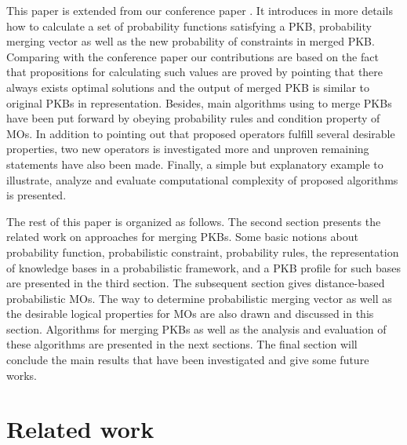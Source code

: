 \documentclass[]{iosart2c}
\begin{document}
  This paper is extended from our conference paper \cite{24}. It introduces in more details how to calculate a set of
  probability functions satisfying a PKB, probability merging vector as well as the new probability of constraints in
  merged PKB. Comparing with the conference paper our contributions are based on the fact that propositions for
  calculating such values are proved by pointing that there always exists optimal solutions \cite{25} and the output of
  merged PKB is similar to original PKBs in representation. Besides, main algorithms using to merge PKBs have been put
  forward by obeying probability rules and condition property of MOs. In addition to pointing out that proposed
  operators fulfill several desirable properties, two new operators is investigated more and unproven remaining
  statements have also been made. Finally, a simple but explanatory example to illustrate, analyze and evaluate
  computational complexity of proposed algorithms is presented.

  The rest of this paper is organized as follows. The second section presents the related work on approaches for
  merging PKBs. Some basic notions about probability function, probabilistic constraint, probability rules, the
  representation of knowledge bases in a probabilistic framework, and a PKB profile for such bases are presented in
  the third section. The subsequent section gives distance-based probabilistic MOs. The way to determine probabilistic
  merging vector as well as the desirable logical properties for MOs are also drawn and discussed in this section.
  Algorithms for merging PKBs as well as the analysis and evaluation of these algorithms are presented in the next
  sections. The final section will conclude the main results that have been investigated and give some future works.


  \section{Related work}
\end{document}
